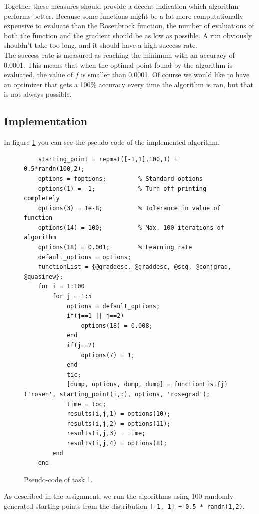\documentclass{article}
\begin{document}
Together these measures should provide a decent indication which algorithm performs better. Because some functions might be a lot more computationally expensive to evaluate than the Rosenbrock function, the number of evaluations of both the function and the gradient should be as low as possible. A run obviously shouldn't take too long, and it should have a high success rate. \\

The success rate is measured as reaching the minimum with an accuracy of 0.0001. This means that when the optimal point found by the algorithm is evaluated, the value of $f$ is smaller than 0.0001. Of course we would like to have an optimizer that gets a 100\% accuracy every time the algorithm is ran, but that is not always possible. 

\subsection{Implementation}
In figure \ref{fig:code} you can see the pseudo-code of the implemented algorithm.

\begin{figure}[h]
\begin{verbatim}
    starting_point = repmat([-1,1],100,1) + 0.5*randn(100,2);
    options = foptions;         % Standard options
    options(1) = -1;            % Turn off printing completely
    options(3) = 1e-8;          % Tolerance in value of function
    options(14) = 100;          % Max. 100 iterations of algorithm
    options(18) = 0.001;        % Learning rate    
    default_options = options;		
    functionList = {@graddesc, @graddesc, @scg, @conjgrad, @quasinew};
    for i = 1:100
        for j = 1:5
            options = default_options;
            if(j==1 || j==2)
                options(18) = 0.008;
            end
            if(j==2)
                options(7) = 1;
            end
            tic;
            [dump, options, dump, dump] = functionList{j}('rosen', starting_point(i,:), options, 'rosegrad');
            time = toc;
            results(i,j,1) = options(10);
            results(i,j,2) = options(11);
            results(i,j,3) = time;
            results(i,j,4) = options(8);
        end 
    end  
\end{verbatim}
\caption{Pseudo-code of task 1.}
\label{fig:code}
\end{figure}

As described in the assignment, we run the algorithms using 100 randomly generated starting points from the distribution \texttt{[-1, 1] + 0.5 * randn(1,2)}. 
\end{document}
